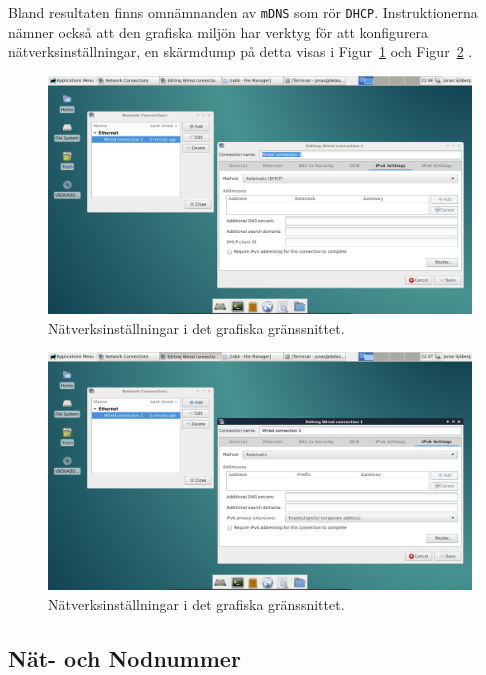 Bland resultaten finns omnämnanden av \texttt{mDNS} som rör \texttt{DHCP}.
Instruktionerna nämner också att den grafiska miljön har verktyg för att
konfigurera nätverksinställningar, en skärmdump på detta visas i
Figur~\ref{fig:scr_1-network_A} och Figur~\ref{fig:scr_1-network_B} .

\begin{figure}[htp]
  \centering
  \includegraphics[scale=0.35]{include/scr_1-network_A.png}
  \caption{Nätverksinställningar i det grafiska gränssnittet.}
  \label{fig:scr_1-network_A}
\end{figure}

\begin{figure}[htp]
  \centering
  \includegraphics[scale=0.35]{include/scr_1-network_B.png}
  \caption{Nätverksinställningar i det grafiska gränssnittet.}
  \label{fig:scr_1-network_B}
\end{figure}


\subsection{Nät- och Nodnummer}

